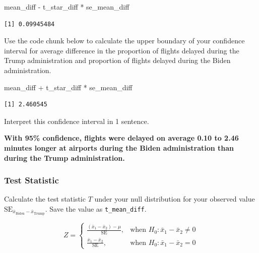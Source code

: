 \documentclass[
  letterpaper,
  DIV=11,
  numbers=noendperiod]{scrartcl}
\newenvironment{Shaded}{\begin{snugshade}}{\end{snugshade}}
\newcommand{\NormalTok}[1]{\textcolor[rgb]{0.00,0.23,0.31}{#1}}
\newcommand{\SpecialCharTok}[1]{\textcolor[rgb]{0.37,0.37,0.37}{#1}}
\begin{document}
\begin{Shaded}
\begin{Highlighting}[]
\NormalTok{mean\_diff }\SpecialCharTok{{-}}\NormalTok{ t\_star\_diff }\SpecialCharTok{*}\NormalTok{ se\_mean\_diff}
\end{Highlighting}
\end{Shaded}

\begin{verbatim}
[1] 0.09945484
\end{verbatim}

Use the code chunk below to calculate the upper boundary of your
confidence interval for average difference in the proportion of flights
delayed during the Trump administration and proportion of flights
delayed during the Biden administration.

\begin{Shaded}
\begin{Highlighting}[]
\NormalTok{mean\_diff }\SpecialCharTok{+}\NormalTok{ t\_star\_diff }\SpecialCharTok{*}\NormalTok{ se\_mean\_diff}
\end{Highlighting}
\end{Shaded}

\begin{verbatim}
[1] 2.460545
\end{verbatim}

Interpret this confidence interval in 1 sentence.

\begin{tcolorbox}[enhanced jigsaw, colback=white, breakable, arc=.35mm, left=2mm, colframe=quarto-callout-warning-color-frame, opacityback=0, rightrule=.15mm, toprule=.15mm, bottomrule=.15mm, leftrule=.75mm]

\textbf{With 95\% confidence, flights were delayed on average 0.10 to
2.46 minutes longer at airports during the Biden administration than
during the Trump administration.}

\end{tcolorbox}

\subsubsection{Test Statistic}\label{test-statistic-1}

Calculate the test statistic \(T\) under your null distribution for your
observed value
\(\text{SE}_{\bar{x}_{\text{Biden}}-\bar{x}_{\text{Trump}}}\). Save the
value as \texttt{t\_mean\_diff}.

\[
Z=
\begin{cases}
\frac{(\bar{x}_1-\bar{x}_2)-\mu}{\text{SE}}, & \text{when } H_0\colon \bar{x}_1-\bar{x}_2 \ne 0 \\
\frac{\bar{x}_1-\bar{x}_2}{\text{SE}}, & \text{when } H_0\colon \bar{x}_1-\bar{x}_2 = 0
\end{cases}
\]
\end{document}
